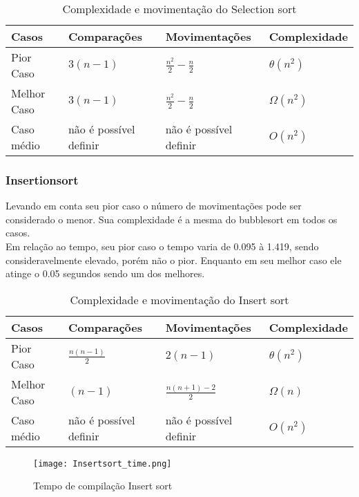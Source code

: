 \documentclass[a4paper.12pt]{article}
\begin{document}
\begin{table}[!ht]
\centering 
\caption{Complexidade e movimentação do Selection sort}
\begin{tabular}{|l|l|l|l|}
\hline
Casos & Comparações & Movimentações & Complexidade\\
\hline
Pior Caso & $3(n - 1)$ & $\frac{n^2}{2} - \frac{n}{2}$ & $\theta(n^2)$\\
\hline
Melhor Caso & $3(n - 1)$ & $\frac{n^2}{2} - \frac{n}{2}$ & $ \Omega(n^2)$\\
\hline 
Caso médio & não é possível definir & não é possível definir & $ O(n^2)$\\
\hline
\end{tabular}
\label{tab05}
\end{table}

\subsubsection{Insertionsort} 


 Levando em conta seu pior caso o número de movimentações pode ser considerado o menor. Sua complexidade é a mesma do bubblesort em todos os casos. \\
Em relação ao tempo, seu pior caso o tempo varia de 0.095 à 1.419, sendo consideravelmente elevado, porém não o pior. Enquanto em seu melhor caso ele atinge o 0.05 segundos sendo um dos melhores. \\


\begin{table}[!ht]
\centering 
\caption{Complexidade e movimentação do Insert sort}
\begin{tabular}{|l|l|l|l|}
\hline
Casos & Comparações & Movimentações & Complexidade\\
\hline
Pior Caso & $\frac{n(n-1)}{2}$ & $ 2(n-1)$ & $\theta(n^2)$\\
\hline
Melhor Caso & $(n-1)$ & $\frac{n(n+1)-2}{2}$ & $ \Omega(n)$\\
\hline 
Caso médio & não é possível definir & não é possível definir & $ O(n^2)$\\
\hline
\end{tabular}
\label{tab02}
\end{table}


\begin{figure}[H]
    \centering
    \texttt{[image: Insertsort\_time.png]}
    \caption{Tempo de compilação Insert sort}
    \label{fig01}
\end{figure}
\end{document}
